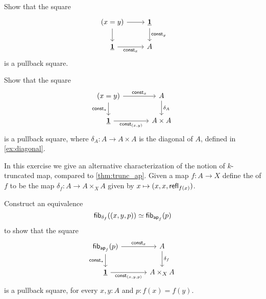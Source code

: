 \begin{exercises}
\exercise \label{ex:id_pb}
\begin{subexenum}
\item Show that the square
\begin{equation*}
\begin{tikzcd}
(x=y) \arrow[r] \arrow[d] & \unit \arrow[d,"\mathsf{const}_y"] \\
\unit \arrow[r,swap,"\mathsf{const}_x"] & A
\end{tikzcd}
\end{equation*}
is a pullback square.
\item Show that the square
\begin{equation*}
\begin{tikzcd}[column sep=large]
(x=y) \arrow[r,"\mathsf{const}_{x}"] \arrow[d,swap,"\mathsf{const}_\ttt"] & A \arrow[d,"\delta_A"] \\
\unit \arrow[r,swap,"{\mathsf{const}_{(x,y)}}"] & A\times A
\end{tikzcd}
\end{equation*}
is a pullback square, where $\delta_A:A\to A\times A$ is the diagonal of $A$, defined in \cref{ex:diagonal}.
\end{subexenum}
\exercise \label{ex:trunc_diagonal_map}In this exercise we give an alternative characterization of the notion of $k$-truncated map, compared to \cref{thm:trunc_ap}. Given a map $f:A\to X$ define the  of $f$ to be the map $\delta_f:A\to A\times_X A$ given by $x\mapsto (x,x,\mathsf{refl}_{f(x)})$.
\begin{subexenum}
\item Construct an equivalence
\begin{equation*}
\eqv{\fib{\delta_f}{(x,y,p)}}{\fib{\apfunc{f}}{p}}
\end{equation*}
to show that the square
\begin{equation*}
\begin{tikzcd}[column sep=large]
\fib{\apfunc{f}}{p} \arrow[r,"\mathsf{const}_x"] \arrow[d,swap,"\mathsf{const}_\ttt"] & A \arrow[d,"\delta_f"] \\
\unit \arrow[r,swap,"{\mathsf{const}_{(x,y,p)}}"] & A\times_X A
\end{tikzcd}
\end{equation*}
is a pullback square, for every $x,y:A$ and $p:f(x)=f(y)$.

\end{subexenum}
\end{exercises}
